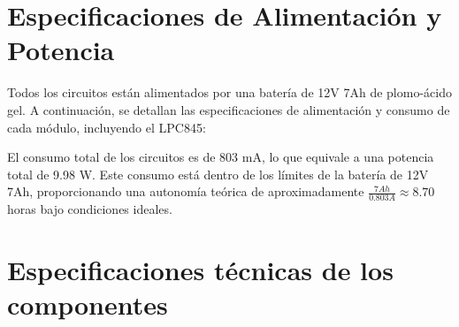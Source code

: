 \section{Especificaciones de Alimentación y Potencia}

Todos los circuitos están alimentados por una batería de 12V 7Ah de plomo-ácido gel. A continuación, se detallan las especificaciones de alimentación y consumo de cada módulo, incluyendo el LPC845:

\begin{table}[h!]
\centering
{}
\caption{Consumo de energía de los circuitos alimentados por la batería de 12V 7Ah.}
\label{tabla:alimentacion}
\end{table}

\noindent
El consumo total de los circuitos es de 803 mA, lo que equivale a una potencia total de 9.98 W. Este consumo está dentro de los límites de la batería de 12V 7Ah, proporcionando una autonomía teórica de aproximadamente \(\frac{7Ah}{0.803A} \approx 8.70\) horas bajo condiciones ideales.

\section{Especificaciones técnicas de los componentes}

